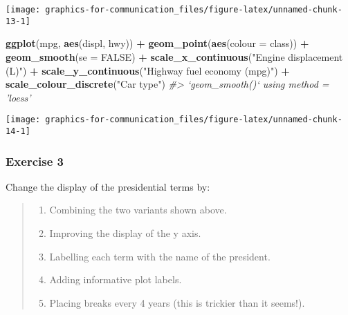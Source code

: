 \documentclass[]{book}
\newenvironment{Shaded}{\begin{snugshade}}{\end{snugshade}}
\newcommand{\CommentTok}[1]{\textcolor[rgb]{0.56,0.35,0.01}{\textit{#1}}}
\newcommand{\DataTypeTok}[1]{\textcolor[rgb]{0.13,0.29,0.53}{#1}}
\newcommand{\KeywordTok}[1]{\textcolor[rgb]{0.13,0.29,0.53}{\textbf{#1}}}
\newcommand{\NormalTok}[1]{#1}
\newcommand{\OperatorTok}[1]{\textcolor[rgb]{0.81,0.36,0.00}{\textbf{#1}}}
\newcommand{\OtherTok}[1]{\textcolor[rgb]{0.56,0.35,0.01}{#1}}
\newcommand{\StringTok}[1]{\textcolor[rgb]{0.31,0.60,0.02}{#1}}
\providecommand{\tightlist}{%
  \setlength{\itemsep}{0pt}\setlength{\parskip}{0pt}}
\theoremstyle{definition}
\theoremstyle{definition}
\theoremstyle{definition}
\theoremstyle{remark}
\begin{document}
\begin{center}\texttt{[image: graphics-for-communication\_files/figure-latex/unnamed-chunk-13-1]} \end{center}

\begin{Shaded}
\begin{Highlighting}[]
\KeywordTok{ggplot}\NormalTok{(mpg, }\KeywordTok{aes}\NormalTok{(displ, hwy)) }\OperatorTok{+}
\StringTok{  }\KeywordTok{geom_point}\NormalTok{(}\KeywordTok{aes}\NormalTok{(}\DataTypeTok{colour =}\NormalTok{ class)) }\OperatorTok{+}
\StringTok{  }\KeywordTok{geom_smooth}\NormalTok{(}\DataTypeTok{se =} \OtherTok{FALSE}\NormalTok{) }\OperatorTok{+}
\StringTok{  }\KeywordTok{scale_x_continuous}\NormalTok{(}\StringTok{"Engine displacement (L)"}\NormalTok{) }\OperatorTok{+}\StringTok{ }
\StringTok{  }\KeywordTok{scale_y_continuous}\NormalTok{(}\StringTok{"Highway fuel economy (mpg)"}\NormalTok{) }\OperatorTok{+}
\StringTok{  }\KeywordTok{scale_colour_discrete}\NormalTok{(}\StringTok{"Car type"}\NormalTok{)}
\CommentTok{#> `geom_smooth()` using method = 'loess'}
\end{Highlighting}
\end{Shaded}

\begin{center}\texttt{[image: graphics-for-communication\_files/figure-latex/unnamed-chunk-14-1]} \end{center}

\hypertarget{exercise-3-54}{%
\subsubsection{Exercise 3}\label{exercise-3-54}}

Change the display of the presidential terms by:

\begin{quote}
\begin{enumerate}
\def\labelenumi{\arabic{enumi}.}
\tightlist
\item
  Combining the two variants shown above.
\item
  Improving the display of the y axis.
\item
  Labelling each term with the name of the president.
\item
  Adding informative plot labels.
\item
  Placing breaks every 4 years (this is trickier than it seems!).
\end{enumerate}
\end{quote}
\end{document}
